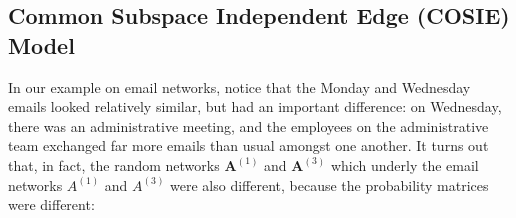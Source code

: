 \documentclass[letterpaper,10pt,english]{jupyterBook}
\begin{document}
\subsection{Common Subspace Independent Edge (COSIE) Model}
\label{\detokenize{representations/ch5/multi-network-models:common-subspace-independent-edge-cosie-model}}
\sphinxAtStartPar
In our example on email networks, notice that the Monday and Wednesday emails looked relatively similar, but had an important difference: on Wednesday, there was an administrative meeting, and the employees on the administrative team exchanged far more emails than usual amongst one another. It turns out that, in fact, the random networks \(\mathbf A^{(1)}\) and \(\mathbf A^{(3)}\) which underly the email networks \(A^{(1)}\) and \(A^{(3)}\) were also different, because the probability matrices were different:

\begin{sphinxVerbatim}[commandchars=\\\{\}]
     
 \PYG{p}{[}\PYG{p}{]} 
 \PYG{p}{[}\PYG{p}{]} 
   \PYG{p}{[}\PYG{p}{]}  
\end{sphinxVerbatim}
\end{document}
